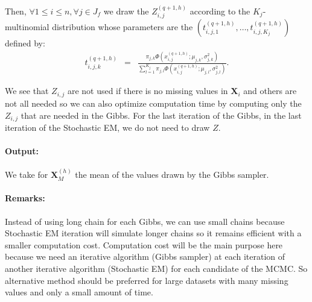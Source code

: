 \documentclass[12pt,a4paper]{report}
\begin{document}
	Then, $\forall 1\leq i \leq n, \forall j \in J_f$ we draw the $Z_{i,j}^{(q+1,h)}$ according to the $K_j$-multinomial distribution whose parameters are the $(t_{i,j,1}^{(q+1,h)},\dots ,t_{i,j,K_j}^{(q+1,h)})$ defined by:
	\begin{eqnarray}
		t_{i,j,k}^{(q+1,h)}&=&\frac{\pi_{j,k}\Phi(x_{i,j}^{(q+1,h)};\mu_{j,k},\sigma_{j,k}^2)}{\sum_{l=1}^{K_j}\pi_{j,l}\Phi(x_{i,j}^{(q+1,h)};\mu_{j,l},\sigma_{j,l}^2) }. \nonumber 
	\end{eqnarray}
		
	
	
	We see that $Z_{i,j}$ are not used if there is no missing values in $\boldsymbol{X}_i$ and others are not all needed so we can also optimize computation time by  computing only the $Z_{i,j}$ that are needed in the Gibbs.
	For the last iteration of the Gibbs, in the last iteration of the Stochastic EM, we do not need to draw $Z$.	\\
	\paragraph{Output:}
		We take for $\boldsymbol{X}_M^{(h)}$ the mean of the values drawn by the Gibbs sampler.
	\paragraph{Remarks:}	
	Instead of using long chain for each Gibbs, we can use small chains because Stochastic EM iteration will simulate longer chains so it remains efficient with a smaller computation cost.
	Computation cost will be the main purpose here because we need an iterative algorithm (Gibbs sampler) at each iteration of another iterative algorithm (Stochastic EM) for each candidate of the MCMC.
	So alternative method should be preferred for large datasets with many missing values and only a small amount of time.\\
	
\end{document}
